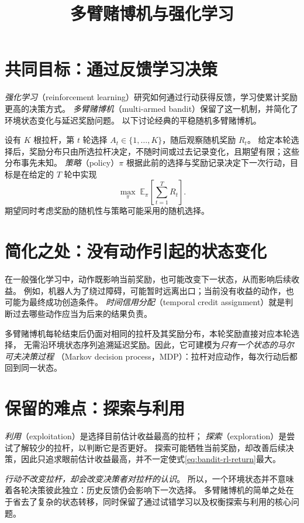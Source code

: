 \documentclass[UTF8,12pt,a4paper,fontset=fandol]{ctexart}
\title{多臂赌博机与强化学习}
\author{}
\date{}
\begin{document}
\maketitle

\section{共同目标：通过反馈学习决策}
\label{sec:bandit-rl-objective}

\emph{强化学习}（reinforcement learning）研究如何通过行动获得反馈，学习使累计奖励更高的决策方式。
\emph{多臂赌博机}（multi-armed bandit）保留了这一机制，并简化了环境状态变化与延迟奖励问题。
以下讨论经典的平稳随机多臂赌博机。

设有 $K$ 根拉杆，第 $t$ 轮选择 $A_t\in\{1,\ldots,K\}$，随后观察随机奖励 $R_t$。
给定本轮选择后，奖励分布只由所选拉杆决定，不随时间或过去记录变化，且期望有限；这些分布事先未知。
\emph{策略}（policy）$\pi$ 根据此前的选择与奖励记录决定下一次行动，目标是在给定的 $T$ 轮中实现
\begin{equation}
  \max_{\pi}\;\mathbb{E}_{\pi}\!\left[\sum_{t=1}^{T}R_t\right].
  \label{eq:bandit-rl-return}
\end{equation}
期望同时考虑奖励的随机性与策略可能采用的随机选择。

\section{简化之处：没有动作引起的状态变化}
\label{sec:bandit-rl-simplification}

在一般强化学习中，动作既影响当前奖励，也可能改变下一状态，从而影响后续收益。
例如，机器人为了绕过障碍，可能暂时远离出口；当前没有收益的动作，也可能为最终成功创造条件。
\emph{时间信用分配}（temporal credit assignment）就是判断过去哪些动作应当为后来的结果负责。

多臂赌博机每轮结束后仍面对相同的拉杆及其奖励分布，本轮奖励直接对应本轮选择，
无需沿环境状态序列追溯延迟奖励。因此，它可建模为\emph{只有一个状态的马尔可夫决策过程}
（Markov decision process，MDP）：拉杆对应动作，每次行动后都回到同一状态。

\section{保留的难点：探索与利用}
\label{sec:bandit-rl-exploration}

\emph{利用}（exploitation）是选择目前估计收益最高的拉杆；
\emph{探索}（exploration）是尝试了解较少的拉杆，以判断它是否更好。
探索可能牺牲当前奖励，却改善后续决策，因此只追求眼前估计收益最高，并不一定使式\eqref{eq:bandit-rl-return}最大。

\emph{行动不改变拉杆，却会改变决策者对拉杆的认识}。
所以，一个环境状态并不意味着各轮决策彼此独立：历史反馈仍会影响下一次选择。
多臂赌博机的简单之处在于省去了复杂的状态转移，同时保留了通过试错学习以及权衡探索与利用的核心问题。
\end{document}
